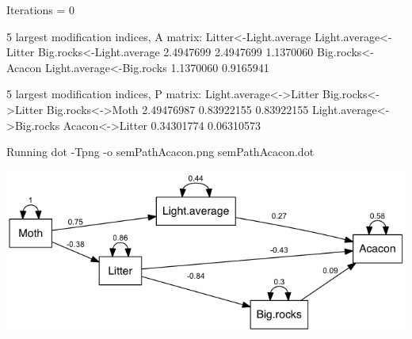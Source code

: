 \documentclass[12pt]{article}
\begin{document}
\begin{Schunk}
\begin{Soutput}
 Iterations =  0 
\end{Soutput}
\begin{Soutput}
 5 largest modification indices, A matrix:
   Litter<-Light.average    Light.average<-Litter Big.rocks<-Light.average 
               2.4947699                2.4947699                1.1370060 
       Big.rocks<-Acacon Light.average<-Big.rocks 
               1.1370060                0.9165941 

  5 largest modification indices, P matrix:
   Light.average<->Litter        Big.rocks<->Litter          Big.rocks<->Moth 
               2.49476987                0.83922155                0.83922155 
Light.average<->Big.rocks           Acacon<->Litter 
               0.34301774                0.06310573 
\end{Soutput}
\begin{Soutput}
Running  dot -Tpng -o semPathAcacon.png  semPathAcacon.dot 
\end{Soutput}
\end{Schunk}

\includegraphics{semPathAcacon.png}

\pagebreak
\end{document}
